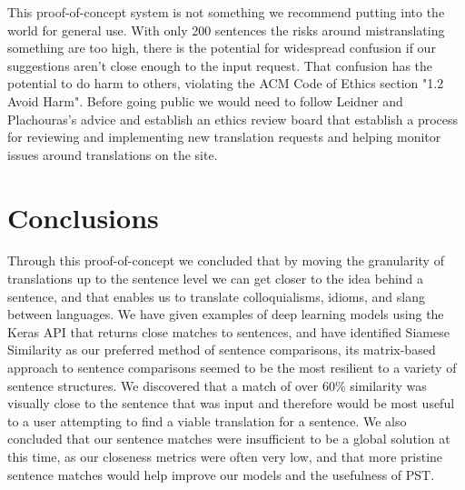 \documentclass[runningheads]{llncs}
\begin{document}
This proof-of-concept system is not something we recommend putting into the world for general use. With only 200 sentences the risks around mistranslating something are too high, there is the potential for widespread confusion if our suggestions aren't close enough to the input request. That confusion has the potential to do harm to others, violating the ACM Code of Ethics section "1.2 Avoid Harm". Before going public we would need to follow Leidner and Plachouras's advice and establish an ethics review board that establish a process for reviewing and implementing new translation requests and helping monitor issues around translations on the site. 
	
	\section{Conclusions}
	Through this proof-of-concept we concluded that by moving the granularity of translations up to the sentence level we can get closer to the idea behind a sentence, and that enables us to translate colloquialisms, idioms, and slang between languages. We have given examples of deep learning models using the Keras API that returns close matches to sentences, and have identified Siamese Similarity as our preferred method of sentence comparisons, its matrix-based approach to sentence comparisons seemed to be the most resilient to a variety of sentence structures. We discovered that a match of over 60\% similarity was visually close to the sentence that was input and therefore would be most useful to a user attempting to find a viable translation for a sentence. We also concluded that our sentence matches were insufficient to be a global solution at this time, as our closeness metrics were often very low, and that more pristine sentence matches would help improve our models and the usefulness of PST.
\end{document}
